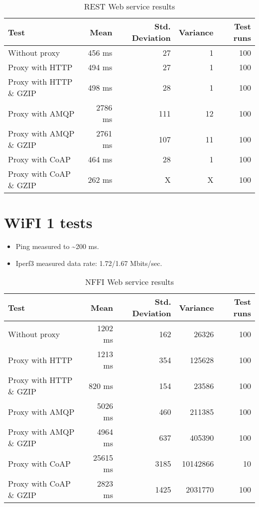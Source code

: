 \begin{appendices}
\begin{table}[H]
\begin{tabular}{| l | r | r | r | r |}
\hline
  \textbf{Test} & \textbf{Mean} & \textbf{Std. Deviation} & \textbf{Variance} & \textbf{Test runs}\\ \hline
  Without proxy & 456 ms & 27 & 1 & 100 \\ \hline
  Proxy with HTTP & 494 ms & 27 & 1 & 100 \\ \hline
  Proxy with HTTP \& GZIP & 498 ms & 28 & 1 & 100 \\ \hline
  Proxy with AMQP & 2786 ms & 111 & 12 & 100 \\ \hline
  Proxy with AMQP \& GZIP & 2761 ms & 107 & 11 & 100\\ \hline
  Proxy with CoAP & 464 ms & 28 & 1 & 100 \\ \hline
  Proxy with CoAP \& GZIP & 262 ms & X & X & 100 \\ \hline
\end{tabular}
\caption{REST Web service results}
\end{table}




\section{WiFI 1 tests}

\begin{itemize}
	\item Ping measured to \textasciitilde 200 ms.
	\item Iperf3 measured data rate: 1.72/1.67 Mbits/sec.
\end{itemize}

\begin{table}[H]
\begin{tabular}{| l | r | r | r | r |}
\hline
  \textbf{Test} & \textbf{Mean} & \textbf{Std. Deviation} & \textbf{Variance} & \textbf{Test runs}\\ \hline
  Without proxy & 1202 ms & 162 & 26326 & 100 \\ \hline
  Proxy with HTTP & 1213 ms & 354 & 125628 & 100 \\ \hline
  Proxy with HTTP \& GZIP & 820 ms & 154 & 23586 & 100 \\ \hline
  Proxy with AMQP & 5026 ms & 460 & 211385 & 100 \\ \hline
  Proxy with AMQP \& GZIP & 4964 ms & 637 & 405390 & 100\\ \hline
  Proxy with CoAP & 25615 ms & 3185 & 10142866 & 10 \\ \hline
  Proxy with CoAP \& GZIP & 2823 ms & 1425 & 2031770 & 100 \\ \hline
\end{tabular}
\caption{NFFI Web service results}
\end{table}



\end{appendices}

